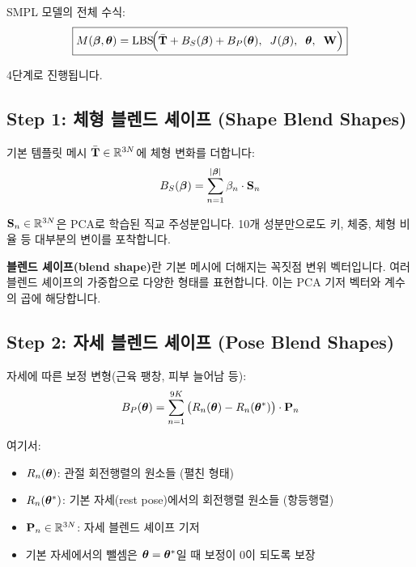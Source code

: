 \documentclass[11pt, a4paper]{report}
\begin{document}
SMPL 모델의 전체 수식:
\begin{equation}
\boxed{
M(\bm{\beta}, \bm{\theta}) = \mathrm{LBS}\!\Big( \bar{\mathbf{T}} + B_S(\bm{\beta}) + B_P(\bm{\theta}),\;\; J(\bm{\beta}),\;\; \bm{\theta},\;\; \mathbf{W} \Big)
}
\label{eq:smpl_full}
\end{equation}

4단계로 진행됩니다.

\subsection{Step 1: 체형 블렌드 셰이프 (Shape Blend Shapes)}

기본 템플릿 메시 $\bar{\mathbf{T}} \in \mathbb{R}^{3N}$에 체형 변화를 더합니다:
\begin{equation}
B_S(\bm{\beta}) = \sum_{n=1}^{|\bm{\beta}|} \beta_n \cdot \mathbf{S}_n
\label{eq:shape_bs}
\end{equation}

$\mathbf{S}_n \in \mathbb{R}^{3N}$은 PCA로 학습된 직교 주성분입니다. 10개 성분만으로도 키, 체중, 체형 비율 등 대부분의 변이를 포착합니다.

\begin{definition}
\textbf{블렌드 셰이프(blend shape)}란 기본 메시에 더해지는 꼭짓점 변위 벡터입니다. 여러 블렌드 셰이프의 가중합으로 다양한 형태를 표현합니다. 이는 PCA 기저 벡터와 계수의 곱에 해당합니다.
\end{definition}

\subsection{Step 2: 자세 블렌드 셰이프 (Pose Blend Shapes)}

자세에 따른 보정 변형(근육 팽창, 피부 늘어남 등):
\begin{equation}
B_P(\bm{\theta}) = \sum_{n=1}^{9K} \big( R_n(\bm{\theta}) - R_n(\bm{\theta}^*) \big) \cdot \mathbf{P}_n
\label{eq:pose_bs}
\end{equation}

여기서:
\begin{itemize}[leftmargin=*]
  \item $R_n(\bm{\theta})$: 관절 회전행렬의 원소들 (펼친 형태)
  \item $R_n(\bm{\theta}^*)$: 기본 자세(rest pose)에서의 회전행렬 원소들 (항등행렬)
  \item $\mathbf{P}_n \in \mathbb{R}^{3N}$: 자세 블렌드 셰이프 기저
  \item 기본 자세에서의 뺄셈은 $\bm{\theta} = \bm{\theta}^*$일 때 보정이 0이 되도록 보장
\end{itemize}
\end{document}
